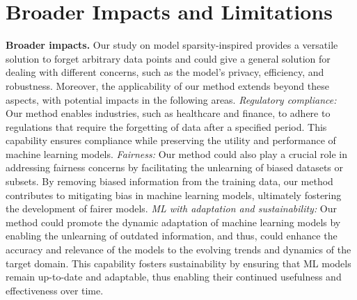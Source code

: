 \section{Broader Impacts and Limitations}
\label{app: broader_impact}
\noindent \textbf{Broader impacts.} 
Our study on model sparsity-inspired {\MU} provides a versatile solution to forget arbitrary data points and could give a general solution for dealing with different concerns, such as the model's privacy, efficiency, and robustness. 
Moreover, the applicability of our method extends beyond these aspects, with potential impacts in the following areas.
  \textit{Regulatory compliance:} Our method enables industries, such as healthcare and finance, to adhere to regulations that require the forgetting of data after a specified period. This capability ensures compliance while preserving the utility and performance of machine learning models. 
  \textit{Fairness:} 
 Our method could also play a crucial role in addressing fairness concerns by facilitating the unlearning of biased datasets or subsets. By removing biased information from the training data, our method contributes to mitigating bias in machine learning models, ultimately fostering the development of fairer models. 
 \textit{ML with adaptation and sustainability:} Our method could promote the dynamic adaptation of machine learning models by enabling the unlearning of outdated information, and thus, could enhance the accuracy and relevance of the models to the evolving trends and dynamics of the target domain. This capability fosters sustainability by ensuring that ML models remain up-to-date and adaptable, thus enabling their continued usefulness and effectiveness over time.

